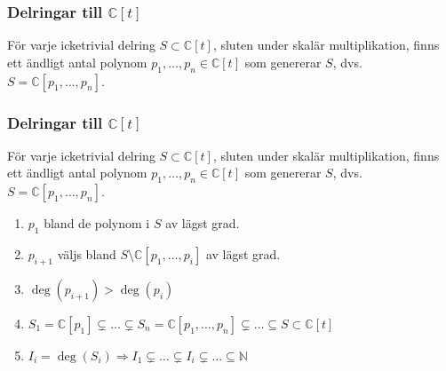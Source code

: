 \documentclass{beamer}
\begin{document}
\begin{frame}
	\frametitle{Delringar till $\mathbb{C}[t]$}
	\begin{Theorem}
		För varje icketrivial delring $S \subset \mathbb{C}[t]$, sluten under skalär multiplikation, finns ett ändligt antal polynom $p_1,\ldots,p_n \in \mathbb{C}[t]$ som genererar $S$, dvs. $S=\mathbb{C}[p_1,\ldots,p_n]$.
	\end{Theorem}
	
\end{frame}

\begin{frame}
	\frametitle{Delringar till $\mathbb{C}[t]$}
	\begin{Theorem}
		För varje icketrivial delring $S \subset \mathbb{C}[t]$, sluten under skalär multiplikation, finns ett ändligt antal polynom $p_1,\ldots,p_n \in \mathbb{C}[t]$ som genererar $S$, dvs. $S=\mathbb{C}[p_1,\ldots,p_n]$.
	\end{Theorem}
	
	\begin{enumerate}
		\item<2->$p_1$ bland de polynom i $S$ av lägst grad.
		\item<3->$p_{i+1}$ väljs bland $S \setminus \mathbb{C}[p_1,\ldots,p_i]$ av lägst grad.
		\item<4->$\deg(p_{i+1})>\deg(p_i)$
		\item<5->$S_1=\mathbb{C}[p_1] \subsetneq \ldots \subsetneq S_n=\mathbb{C}[p_1,\ldots,p_n] \subsetneq \ldots \subseteq S \subset \mathbb{C}[t]$
		\item<6->$I_i=\deg(S_i) \Longrightarrow I_1 \subsetneq \ldots \subsetneq I_i \subsetneq \ldots \subseteq \mathbb{N}$
	\end{enumerate}
\end{frame}
\end{document}
